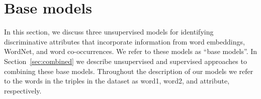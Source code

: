 \documentclass[11pt,a4paper]{article}
\newcommand{\secref}[1]{Section~\ref{#1}}
\begin{document}







  
\section{Base models} \label{individual}

In this section, we discuss three unsupervised models for identifying
discriminative attributes that incorporate information from word
embeddings, WordNet, and word co-occurrences. We refer to these models
as ``base models''. In \secref{sec:combined} we describe unsupervised
and supervised approaches to combining these base models. Throughout
the description of our models we refer to the words in the triples in
the dataset as word1, word2, and attribute, respectively.
\end{document}
